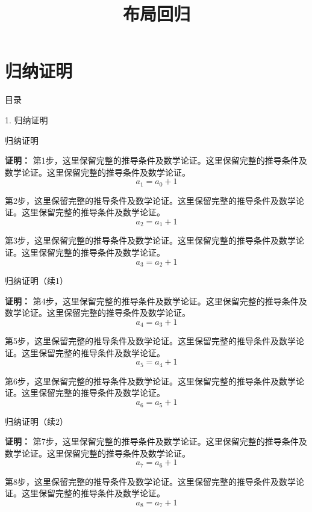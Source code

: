 \documentclass[aspectratio=169,10pt,fontset=fandol]{ctexbeamer}
\title{布局回归}
\begin{document}
\section{归纳证明}
\begin{frame}[t,fragile]{目录}
\normalsize
{\color{blue}\normalsize 1. 归纳证明\par}\vspace{0.22em}
\end{frame}
\begin{frame}[t,fragile]{归纳证明}
\footnotesize
{\footnotesize
\textbf{证明：}
第1步，这里保留完整的推导条件及数学论证。这里保留完整的推导条件及数学论证。这里保留完整的推导条件及数学论证。\[a_{1}=a_{0}+1\]

第2步，这里保留完整的推导条件及数学论证。这里保留完整的推导条件及数学论证。这里保留完整的推导条件及数学论证。\[a_{2}=a_{1}+1\]

第3步，这里保留完整的推导条件及数学论证。这里保留完整的推导条件及数学论证。这里保留完整的推导条件及数学论证。\[a_{3}=a_{2}+1\]


}
\end{frame}
\begin{frame}[t,fragile]{归纳证明（续1）}
\footnotesize
{\footnotesize
\textbf{证明：}
第4步，这里保留完整的推导条件及数学论证。这里保留完整的推导条件及数学论证。这里保留完整的推导条件及数学论证。\[a_{4}=a_{3}+1\]

第5步，这里保留完整的推导条件及数学论证。这里保留完整的推导条件及数学论证。这里保留完整的推导条件及数学论证。\[a_{5}=a_{4}+1\]

第6步，这里保留完整的推导条件及数学论证。这里保留完整的推导条件及数学论证。这里保留完整的推导条件及数学论证。\[a_{6}=a_{5}+1\]


}
\end{frame}
\begin{frame}[t,fragile]{归纳证明（续2）}
\normalsize
{\normalsize
\textbf{证明：}
第7步，这里保留完整的推导条件及数学论证。这里保留完整的推导条件及数学论证。这里保留完整的推导条件及数学论证。\[a_{7}=a_{6}+1\]

第8步，这里保留完整的推导条件及数学论证。这里保留完整的推导条件及数学论证。这里保留完整的推导条件及数学论证。\[a_{8}=a_{7}+1\]
}
\end{frame}
\end{document}
